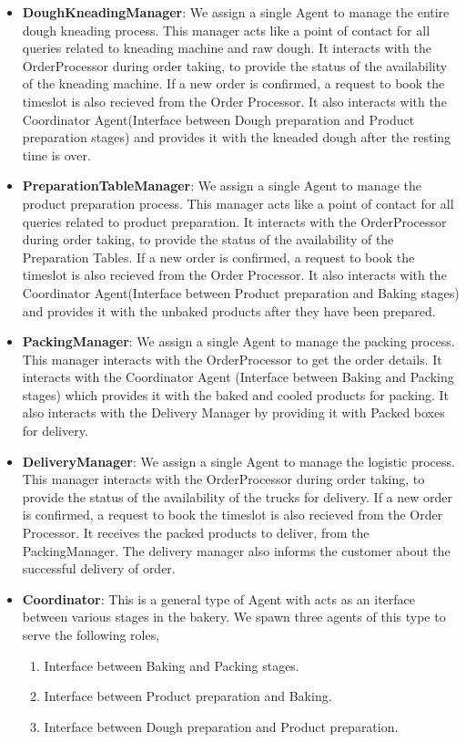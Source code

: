 \documentclass[12pt]{article}
\begin{document}
\begin{itemize}
    \item \textbf{DoughKneadingManager}: We assign a single Agent to manage the entire dough kneading process. This manager acts like a point of contact for all queries related to kneading machine and raw dough. It interacts with the OrderProcessor during order taking, to provide the status of the availability of the kneading machine. If a new order is confirmed, a request to book the timeslot is also recieved from the Order Processor. It also interacts with the Coordinator Agent(Interface between Dough preparation and Product preparation stages) and provides it with the kneaded dough after the resting time is over.
    \item \textbf{PreparationTableManager}: We assign a single Agent to manage the product preparation process. This manager acts like a point of contact for all queries related to product preparation. It interacts with the OrderProcessor during order taking, to provide the status of the availability of the Preparation Tables. If a new order is confirmed, a request to book the timeslot is also recieved from the Order Processor. It also interacts with the Coordinator Agent(Interface between Product preparation and Baking stages) and provides it with the unbaked products after they have been prepared.
    \item \textbf{PackingManager}: We assign a single Agent to manage the packing process. This manager interacts with the OrderProcessor to get the order details. It interacts with the Coordinator Agent (Interface between Baking and Packing stages) which provides it with the baked and cooled products for packing. It also interacts with the Delivery Manager by providing it with Packed boxes for delivery.
    \item \textbf{DeliveryManager}: We assign a single Agent to manage the logistic process. This manager interacts with the OrderProcessor during order taking, to provide the status of the availability of the trucks for delivery. If a new order is confirmed, a request to book the timeslot is also recieved from the Order Processor. It receives the packed products to deliver, from the PackingManager. The delivery manager also informs the customer about the successful delivery of order.
    \item \textbf{Coordinator}: This is a general type of Agent with acts as an iterface between various stages in the bakery. We spawn three agents of this type to serve the following roles,
    \begin{enumerate}
    \item Interface between Baking and Packing stages.
    \item Interface between Product preparation and Baking.
    \item Interface between Dough preparation and Product preparation.
    \end{enumerate}
\end{itemize}
\end{document}
